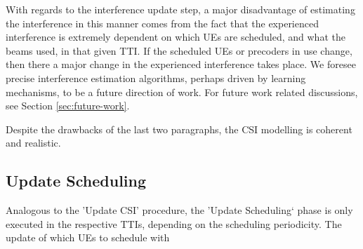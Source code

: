 With regards to the interference update step, a major disadvantage of estimating the interference in this manner comes from the fact that the experienced interference is extremely dependent on which UEs are scheduled, and what the beams used, in that given TTI. If the scheduled UEs or precoders in use change, then there a major change in the experienced interference takes place. We foresee precise interference estimation algorithms, perhaps driven by learning mechanisms, to be a future direction of work. For future work related discussions, see Section \ref{sec:future-work}.

Despite the drawbacks of the last two paragraphs, the \ac{CSI} modelling is coherent and realistic. 

\subsection{Update Scheduling}
Analogous to the 'Update CSI' procedure, the 'Update Scheduling` phase is only executed in the respective TTIs, depending on the scheduling periodicity. The update of which UEs to schedule with 

